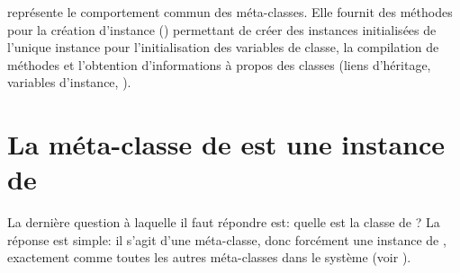 \documentclass[a4paper,10pt,twoside]{book}
\begin{document}
 représente le comportement commun des méta-classes.
Elle fournit des méthodes pour la création d'instance () permettant de créer des instances initialisées de l'unique instance  pour l'initialisation des variables de classe, la compilation de méthodes et l'obtention d'informations à propos des classes (liens d'héritage, variables d'instance, \etc).


\section{La méta-classe de  est une instance de }

La dernière question à laquelle il faut répondre est: quelle est la classe de ?
La réponse est simple: il s'agit d'une méta-classe, donc forcément une instance de , exactement comme toutes les autres méta-classes dans le système (voir ).
\end{document}
